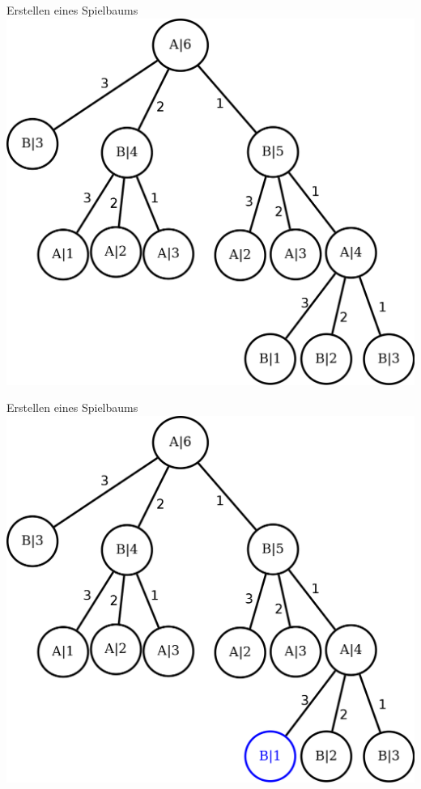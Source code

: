 \documentclass[18pt]{beamer}
\begin{document}
\begin{frame}{Erstellen eines Spielbaums}
\includegraphics[scale=0.4]{baum0.png}
\end{frame}

\begin{frame}{Erstellen eines Spielbaums}
\includegraphics[scale=0.4]{baum10.png}
\end{frame}
\end{document}
